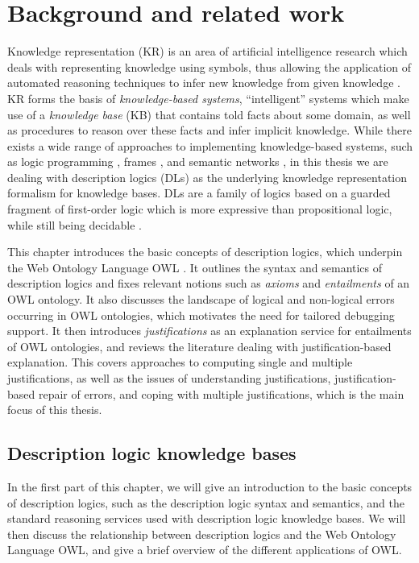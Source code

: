 \chapter{Background and related work}
\label{chap:background}

Knowledge representation (KR) is an area of artificial intelligence research which deals with representing knowledge using  symbols, thus allowing the application of automated reasoning techniques to infer new knowledge from given knowledge \cite{brachman2004aa}. KR forms the basis of \emph{knowledge-based systems}, \enquote{intelligent} systems which make use of a \emph{knowledge base} (KB) that contains told facts about some domain, as well as procedures to reason over these facts and infer implicit knowledge. While there exists a wide range of approaches to implementing knowledge-based systems, such as logic programming \cite{baral94aa}, frames \cite{minsky74aa}, and semantic networks \cite{sowa87st}, in this thesis we are dealing with description logics (DLs) \cite{dlhb03} as the underlying knowledge representation formalism for knowledge bases. DLs are a family of logics based on a guarded fragment of first-order logic which is more expressive than propositional logic, while still being decidable \cite{dlhb03}.

This chapter introduces the basic concepts of description logics, which underpin the Web Ontology Language OWL \cite{horrocks03vn,cuenca-grau08kw}. It outlines the syntax and semantics of description logics and fixes relevant notions such as \emph{axioms} and \emph{entailments} of an OWL ontology. It also discusses the landscape of logical and non-logical errors occurring in OWL ontologies, which motivates the need for tailored debugging support. It then introduces \emph{justifications} as an explanation service for entailments of OWL ontologies, and reviews the literature dealing with justification-based explanation. This covers approaches to computing single and multiple justifications, as well as the issues of understanding justifications, justification-based repair of errors, and coping with multiple justifications, which is the main focus of this thesis.

\section{Description logic knowledge bases}

In the first part of this chapter, we will give an introduction to the basic concepts of description logics, such as the description logic syntax and semantics, and the standard reasoning services used with description logic knowledge bases. We will then discuss the relationship between description logics and the Web Ontology Language OWL, and give a brief overview of the different applications of OWL.

